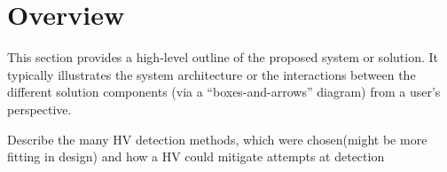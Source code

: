 \section{Overview}\label{s:overview}

This section provides a high-level outline of the proposed system or solution.
It typically illustrates the system architecture or the interactions between the
different solution components (via a “boxes-and-arrows” diagram) from a user’s
perspective.

Describe the many HV detection methods, which were chosen(might be more fitting in design) and how a HV could mitigate attempts at detection  


